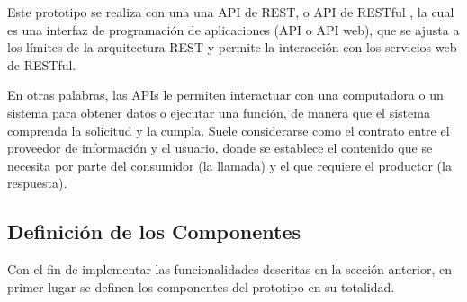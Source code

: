 Este prototipo se realiza con una una API de REST, o API de RESTful \cite{api}, la cual es una interfaz de programación de aplicaciones (API o API web), que se ajusta a los límites de la arquitectura REST y permite la interacción con los servicios web de RESTful.

En otras palabras, las APIs le permiten interactuar con una computadora o un sistema para obtener datos o ejecutar una función, de manera que el sistema comprenda la solicitud y la cumpla. Suele considerarse como el contrato entre el proveedor de información y el usuario, donde se establece el contenido que se necesita por parte del consumidor (la llamada) y el que requiere el productor (la respuesta). \\

\subsection{Definición de los Componentes}

Con el fin de implementar las funcionalidades descritas en la sección anterior, en primer lugar se definen los componentes del prototipo en su totalidad.

